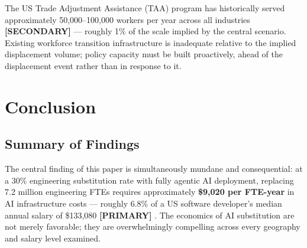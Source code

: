 \documentclass{article}
\newcommand{\PRIMARY}{\textbf{[PRIMARY]}}
\newcommand{\SECONDARY}{\textbf{[SECONDARY]}}
\begin{document}
The US Trade Adjustment Assistance (TAA) program has historically served approximately
50,000--100,000 workers per year across all industries \SECONDARY{} --- roughly 1\% of the
scale implied by the central scenario. Existing workforce transition infrastructure is
inadequate relative to the implied displacement volume; policy capacity must be built
proactively, ahead of the displacement event rather than in response to it.

\section{Conclusion}
\label{sec:conclusion}

\subsection{Summary of Findings}

The central finding of this paper is simultaneously mundane and consequential: at a 30\%
engineering substitution rate with fully agentic AI deployment, replacing 7.2 million
engineering FTEs requires approximately \textbf{\$9,020 per FTE-year} in AI infrastructure
costs --- roughly 6.8\% of a US software developer's median annual salary of \$133,080
\PRIMARY{} \citep{bls2024oes}. The economics of AI substitution are not merely favorable; they are
overwhelmingly compelling across every geography and salary level examined.
\end{document}
